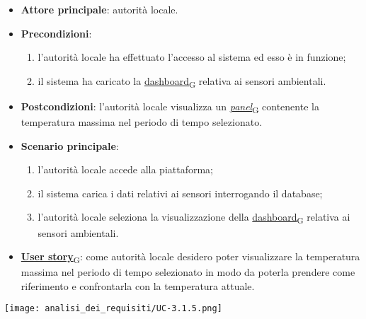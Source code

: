 \begin{itemize}
	\item \textbf{Attore principale}: autorità locale.
	\item \textbf{Precondizioni}:
	      \begin{enumerate}
		      \item l'autorità locale ha effettuato l'accesso al sistema ed esso è in funzione;
		      \item il sistema ha caricato la \href{https://7last.github.io/docs/pb/documentazione-interna/glossario\#dashboard}{dashboard\textsubscript{G}} relativa ai sensori ambientali.
	      \end{enumerate}
	\item \textbf{Postcondizioni}: l'autorità locale visualizza un \href{https://7last.github.io/docs/pb/documentazione-interna/glossario\#panel}{\textit{panel}\textsubscript{G}} contenente la temperatura massima nel periodo di tempo selezionato.
	\item \textbf{Scenario principale}:
	      \begin{enumerate}
		      \item l'autorità locale accede alla piattaforma;
		      \item il sistema carica i dati relativi ai sensori interrogando il database;
		      \item l'autorità locale seleziona la visualizzazione della \href{https://7last.github.io/docs/pb/documentazione-interna/glossario\#dashboard}{dashboard\textsubscript{G}} relativa ai sensori ambientali.
	      \end{enumerate}
	\item \href{https://7last.github.io/docs/pb/documentazione-interna/glossario\#user-story}{\textbf{User story}\textsubscript{G}}:
	      come autorità locale desidero poter visualizzare la temperatura massima nel periodo di tempo selezionato
	      in modo da poterla prendere come riferimento e confrontarla con la temperatura attuale.
\end{itemize}
\begin{center}
	\texttt{[image: analisi\_dei\_requisiti/UC-3.1.5.png]}
\end{center}


